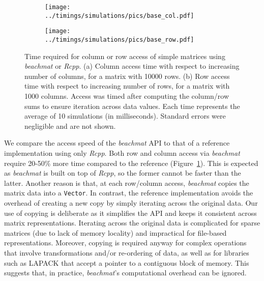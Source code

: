 \documentclass[10pt,letterpaper]{article}
\newcommand{\beachmat}{\textit{beachmat}}
\newcommand{\code}[1]{\texttt{#1}}
\begin{document}
\begin{figure}[bt]
    \centering
    \begin{subfigure}[b]{0.49\textwidth}
        \texttt{[image: ../timings/simulations/pics/base\_col.pdf]}
        \caption{}
    \end{subfigure}
    \begin{subfigure}[b]{0.49\textwidth}
        \texttt{[image: ../timings/simulations/pics/base\_row.pdf]}
        \caption{}
    \end{subfigure}
    \caption{Time required for column or row access of simple matrices using \beachmat{} or \textit{Rcpp}.
        (a) Column access time with respect to increasing number of columns, for a matrix with 10000 rows.
        (b) Row access time with respect to increasing number of rows, for a matrix with 1000 columns.
        Access was timed after computing the column/row sums to ensure iteration across data values.
        Each time represents the average of 10 simulations (in milliseconds).
        Standard errors were negligible and are not shown.
    }
    \label{fig:basetime}
\end{figure}

We compare the access speed of the \beachmat{} API to that of a reference implementation using only \textit{Rcpp}.
Both row and column access via \beachmat{} require 20-50\% more time compared to the reference (Figure~\ref{fig:basetime}).
This is expected as \beachmat{} is built on top of \textit{Rcpp}, so the former cannot be faster than the latter.
Another reason is that, at each row/column access, \beachmat{} copies the matrix data into a \code{Vector}.
In contrast, the reference implementation avoids the overhead of creating a new copy by simply iterating across the original data.
Our use of copying is deliberate as it simplifies the API and keeps it consistent across matrix representations. 
Iterating across the original data is complicated for sparse matrices (due to lack of memory locality) and impractical for file-based representations.
Moreover, copying is required anyway for complex operations that involve transformations and/or re-ordering of data, as well as for libraries such as LAPACK that accept a pointer to a contiguous block of memory.
This suggests that, in practice, \beachmat{}'s computational overhead can be ignored.
\end{document}
